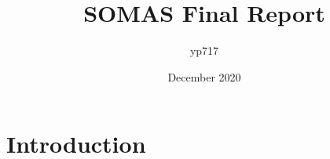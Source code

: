 \documentclass{article}
\title{SOMAS Final Report}
\author{yp717}
\date{December 2020}
\begin{document}
\maketitle

\section{Introduction}
\end{document}
